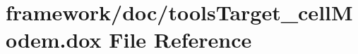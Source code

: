 \hypertarget{tools_target__cell_modem_8dox}{}\section{framework/doc/tools\+Target\+\_\+cell\+Modem.dox File Reference}
\label{tools_target__cell_modem_8dox}
